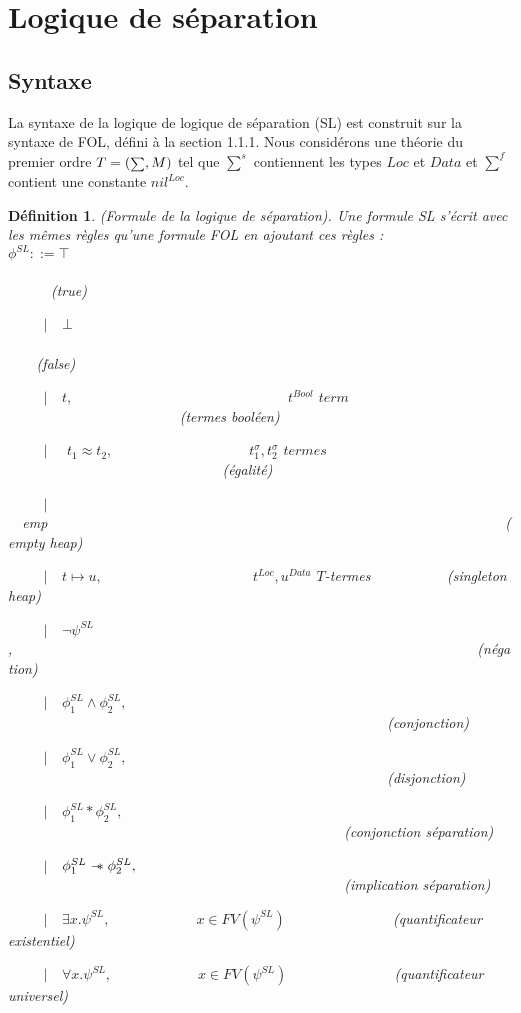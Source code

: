 \documentclass[9pt]{book}
\newcommand\sepimp{\mathrel{-\mkern-6mu*}}
\newtheorem{definition}{D\'efinition}[section]
\begin{document}
	\section{Logique de s\'eparation}
		\subsection{Syntaxe}
	La syntaxe de la logique de logique de s\'eparation (SL) est construit sur la syntaxe de FOL, d\'efini \`a la section 1.1.1. Nous consid\'erons une th\'eorie du premier ordre $T=(\mathsmaller\sum,M)$ tel que $\sum^{s}$ contiennent les types $Loc$ et $Data$ et $\sum^{f}$ contient une constante $nil^{Loc}$.
	\begin{definition}
	(Formule de la logique de s\'eparation). Une formule SL s'\'ecrit avec les m\^emes r\`egles qu'une formule FOL en ajoutant ces r\`egles :
	\\$\phi^{SL} ::= \top$~~~~~~~~~~~~~~~~~~~~~~~~~~~~~~~~~~~~~~~~~~~~~~~~~~~~~~~~~~~~~~~~~~~~~~~~~~~~(true)\par
~~~~~$|$~~$\bot$~~~~~~~~~~~~~~~~~~~~~~~~~~~~~~~~~~~~~~~~~~~~~~~~~~~~~~~~~~~~~~~~~~~~~~~~~~(false)
\par
~~~~~$|$~~$t,$~~~~~~~~~~~~~~~~~~~~~~~~~~~~~~$t^{Bool}$ $term$~~~~~~~~~~~~~~~~~~~~~~~~(termes bool\'een)\par
~~~~~$|$~~ $t_{1} \approx t_{2},$~~~~~~~~~~~~~~~~~~~$t_{1}^{\sigma},t_{2}^{\sigma}$ $termes$~~~~~~~~~~~~~~~~~~~~~~~~~~~~~~(\'egalit\'e)\par
~~~~~$|$~~emp~~~~~~~~~~~~~~~~~~~~~~~~~~~~~~~~~~~~~~~~~~~~~~~~~~~~~~~~~~~~~~~~(empty heap)\par
~~~~~$|$~~$t\mapsto u,$~~~~~~~~~~~~~~~~~~~~~$t^{Loc},u^{Data}$ $T$-termes ~~~~~~~~~~(singleton heap)\par 
~~~~~$|$~~$\neg\psi^{SL}$,~~~~~~~~~~~~~~~~~~~~~~~~~~~~~~~~~~~~~~~~~~~~~~~~~~~~~~~~~~~~~~~~~(n\'egation)\par
~~~~~$|$~~$\phi_{1}^{SL} \land \phi_{2}^{SL},$~~~~~~~~~~~~~~~~~~~~~~~~~~~~~~~~~~~~~~~~~~~~~~~~~~~~~(conjonction)\par
~~~~~$|$~~$\phi_{1}^{SL} \lor \phi_{2}^{SL},$~~~~~~~~~~~~~~~~~~~~~~~~~~~~~~~~~~~~~~~~~~~~~~~~~~~~~(disjonction)\par
~~~~~$|$~~$\phi_{1}^{SL} * \phi_{2}^{SL},$~~~~~~~~~~~~~~~~~~~~~~~~~~~~~~~~~~~~~~~~~~~~~~~(conjonction s\'eparation)\par
~~~~~$|$~~$\phi_{1}^{SL} \sepimp \phi_{2}^{SL},$~~~~~~~~~~~~~~~~~~~~~~~~~~~~~~~~~~~~~~~~~~~~~~~(implication s\'eparation)\par
~~~~~$|$~~$\exists x.\psi^{SL},$~~~~~~~~~~~~$x\in FV(\psi^{SL})$~~~~~~~~~~~~~~~(quantificateur existentiel)\par
~~~~~$|$~~$\forall x.\psi^{SL},$~~~~~~~~~~~~$x\in FV(\psi^{SL})$~~~~~~~~~~~~~~~(quantificateur universel)
	\end{definition}
\end{document}
